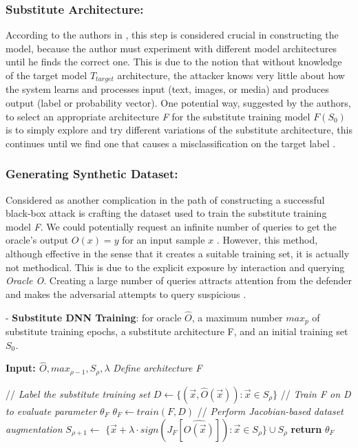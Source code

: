 \documentclass[grad,lot,lof,11pt,oneside,onehalfspace]{RUthesis}
\begin{document}
\subsubsection*{Substitute Architecture:} According to the authors in \cite{papernot_practical_2017}, this step is considered crucial in constructing the model, because the author must experiment with different model architectures until he finds the correct one. This is due to the notion that without knowledge of the target model \textit{$T_{target}$} architecture, the attacker knows very little about how the system learns and processes input (text, images, or media) and produces output (label or probability vector). One potential way, suggested by the authors, to select an appropriate architecture \textit{F} for the substitute training model $F(S_{0})$ is to simply explore and try different variations of the substitute architecture, this continues  until we find one that causes a misclassification on the target label \cite{papernot_practical_2017}.
\subsubsection*{Generating Synthetic Dataset:} Considered as another complication in the path of constructing a successful black-box attack is crafting the dataset used to train the substitute training model \textit{F}. We could potentially request an infinite number of queries to get the oracle's output $\textit{O}(x)=y$ for an input sample  $x$ \cite{papernot_practical_2017}. However, this method, although effective in the sense that it creates a suitable training set, it is actually not methodical. This is due to the explicit exposure by interaction and querying \textit{Oracle O}. Creating a large number of queries attracts attention from the defender and makes the adversarial attempts to query suspicious \cite{papernot_practical_2017}. 
\begin{algorithm}
	\caption{- \textbf{Substitute DNN Training}: for oracle $\hat{O}$, a maximum number \textit{$max_{p}$} of substitute training epochs, a substitute architecture  F, and an initial training set \textit{$S_{0}$.}}\label{euclid}
	\begin{algorithmic}[1]
		\State \textbf{Input: $\hat{O}, max_{\rho-1}, S_{\rho}, \lambda$}
		\State \textit{Define architecture \textit{F}}

		\State \quad \textrm{//} \quad \textit{Label the substitute training set}
		\State$D\leftarrow\{(\vec{x},\hat{O}(\vec{x})):\vec{x}\in S_{\rho}\}$
		\State\quad \textrm{//} \quad \textit{Train F on D to evaluate parameter $\theta_{F}$}
		\State $\theta_{F} \leftarrow train(F,D)$
		\State\quad \textrm{//} \quad \textit{Perform Jacobian-based dataset augmentation}
		\State $S_{\rho+1}\leftarrow$ ${\{\vec{x}+\lambda \cdotp sign(J_{F}[\hat{O(\vec{x})}]):\vec{x}\in S_{\rho}\}} \cup S_{\rho}$
		\EndFor
		\State \textbf{return} $\theta_{F}$
	\end{algorithmic}
\end{algorithm}
\end{document}
